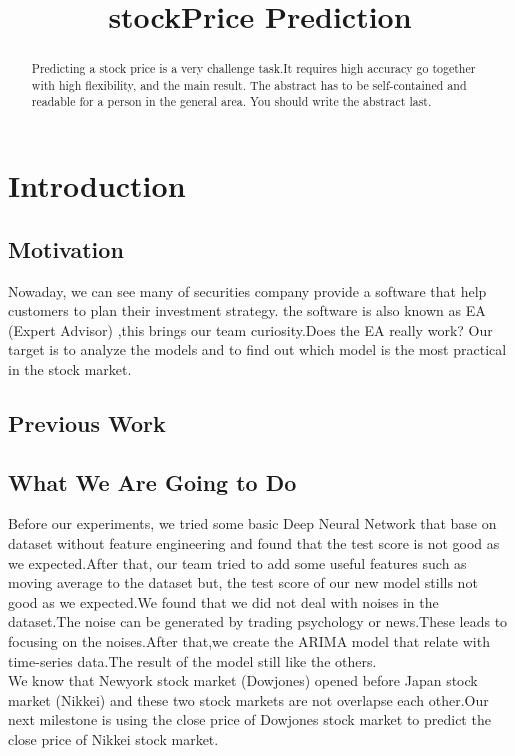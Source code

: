 \documentclass{article}
\title{stockPrice Prediction}
\begin{document}
%
\maketitle
%
\begin{abstract}
Predicting a stock price is a very challenge task.It requires high accuracy go together with high flexibility, and the main result.  The abstract has to be
self-contained and readable for a person in the general area. You
should write the abstract last.
\end{abstract}

\section{Introduction}\label{sec:intro}

\subsection{Motivation}

Nowaday, we can see many of securities company provide a software that help customers to plan their investment strategy.
the software is also known as EA (Expert Advisor) ,this brings our team curiosity.Does the EA really work? Our target is to analyze the models and to find out which model is the most practical in the stock market.

\subsection{Previous Work}


\subsection{What We Are Going to Do}

Before our experiments, we tried some basic Deep Neural Network that base on dataset without feature engineering and found that the test score is not good as we expected.After that, our team tried to add some useful features such as moving average to the dataset but, the test score of our new model stills not good as we expected.We found that we did not deal with noises in the dataset.The noise can be generated by trading psychology or news.These leads to focusing on the noises.After that,we create the ARIMA model that relate with time-series data.The result of the model still like the others.\\We know that Newyork stock market (Dowjones) opened before Japan stock market (Nikkei) and these two stock markets are not overlapse each other.Our next milestone is using the close price of Dowjones stock market to predict the close price of Nikkei stock market.
\end{document}
